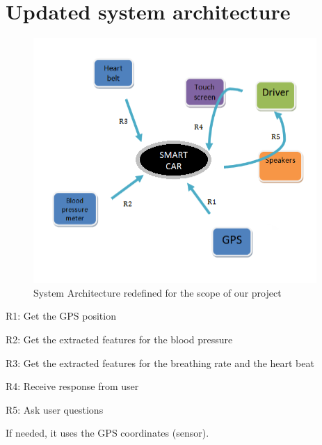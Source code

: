 \newpage
\section{Updated system architecture}
\begin{figure}[h]
	\centering
	\includegraphics[scale=0.8]{./images/implementationArchitecture}		%
	\caption{System Architecture redefined for the scope of our project}					%
	\label{fig:impsys}									%
\end{figure}

\begin{description}\addtolength{\itemsep}{-0.5\baselineskip}
	\item{R1:} Get the GPS position
	\item{R2:} Get the extracted features for the blood pressure
	\item{R3:} Get the extracted features for the breathing rate and the heart beat
	\item{R4:} Receive response from user
	\item{R5:} Ask user questions

	
	If needed, it uses the GPS coordinates (sensor).
\end{description}
